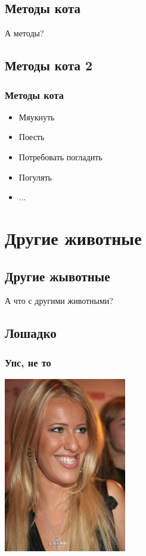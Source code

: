 \documentclass[compress,red]{beamer}
\begin{document}
\subsection{Методы кота}
\begin{frame}
  \begin{center}
    \Huge{А методы?}
  \end{center}
\end{frame}

\subsection{Методы кота 2}
\begin{frame}[fragile]
  \frametitle{Методы кота}
  \begin{itemize}[<+->]
    \item Мяукнуть
    \item Поесть
    \item Потребовать погладить
    \item Погулять
    \item ...
  \end{itemize}
\end{frame}

\section{Другие животные}

\subsection{Другие жывотные}
\begin{frame}
  \begin{center}
    \Huge{А что с другими животными?}
  \end{center}
\end{frame}

\subsection{Лошадко}
\begin{frame}[fragile]
  \frametitle{Упс, не то}
  \centerline{\includegraphics[width=0.4\textwidth]{images/loshadko.jpg}}
\end{frame}
\end{document}
